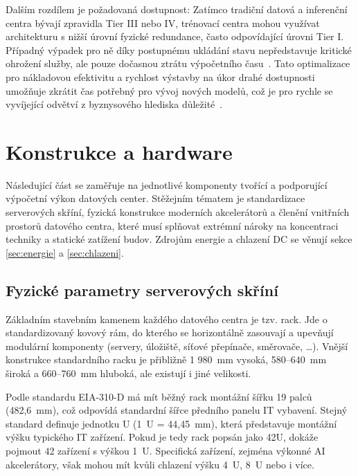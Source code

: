 Dalším rozdílem je požadovaná dostupnost: Zatímco tradiční datová a inferenční centra bývají zpravidla Tier III nebo IV, trénovací centra mohou využívat architekturu s nižší úrovní fyzické redundance, často odpovídající úrovni Tier I. Případný výpadek pro ně díky postupnému ukládání stavu nepředstavuje kritické ohrožení služby, ale pouze dočasnou ztrátu výpočetního času~\cite[s.~83]{barroso_data_2026}. Tato optimalizace pro nákladovou efektivitu a rychlost výstavby na úkor drahé dostupnosti umožňuje zkrátit čas potřebný pro vývoj nových modelů, což je pro rychle se vyvíjející odvětví z byznysového hlediska důležité~\cite[s.~24]{ginzburg-ganz_technical_2025}.

\section{Konstrukce a hardware}
\label{sec:konstrukce}


Následující část se zaměřuje na jednotlivé komponenty tvořící a podporující výpočetní výkon datových center. Stěžejním tématem je standardizace serverových skříní, fyzická konstrukce moderních akcelerátorů a členění vnitřních prostorů datového centra, které musí splňovat extrémní nároky na koncentraci techniky a statické zatížení budov. Zdrojům energie a chlazení DC se věnují sekce \ref{sec:energie} a \ref{sec:chlazeni}.

\subsection{Fyzické parametry serverových skříní}
\label{subsec:racky}

Základním stavebním kamenem každého datového centra je tzv. rack. Jde o standardizovaný kovový rám, do kterého se horizontálně zasouvají a upevňují modulární komponenty (servery, úložiště, síťové přepínače, směrovače, \dots{}). Vnější konstrukce standardního racku je přibližně 1 980~mm vysoká, 580--640~mm široká a 660--760~mm hluboká, ale existují i jiné velikosti.~\cite[s.~2940]{kant_data_2009}

Podle standardu EIA-310-D má mít běžný rack montážní šířku 19 palců (482,6~mm), což odpovídá standardní šířce předního panelu IT vybavení. Stejný standard definuje jednotku U (1~U = 44,45~mm), která představuje montážní výšku typického IT zařízení. Pokud je tedy rack popsán jako 42U, dokáže pojmout 42 zařízení s výškou 1~U. Specifická zařízení, zejména výkonné AI akcelerátory, však mohou mít kvůli chlazení výšku 4~U, 8~U nebo i více.~\cite{hu_how_2020}

